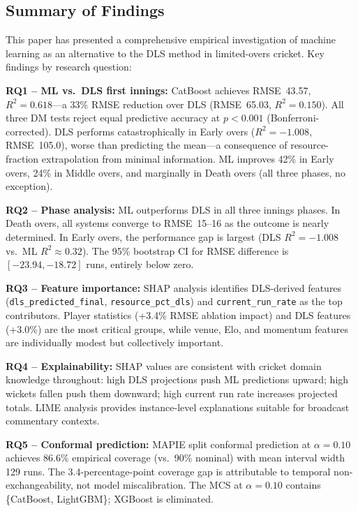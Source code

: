 \documentclass[10pt,a4paper,twocolumn]{article}
\begin{document}
\subsection{Summary of Findings}

This paper has presented a comprehensive empirical investigation of machine learning as an alternative to the DLS method in limited-overs cricket. Key findings by research question:

\textbf{RQ1 -- ML vs.\ DLS first innings:} CatBoost achieves RMSE~43.57, $R^2=0.618$---a 33\% RMSE reduction over DLS (RMSE~65.03, $R^2=0.150$). All three DM tests reject equal predictive accuracy at $p < 0.001$ (Bonferroni-corrected). DLS performs catastrophically in Early overs ($R^2 = -1.008$, RMSE~105.0), worse than predicting the mean---a consequence of resource-fraction extrapolation from minimal information. ML improves 42\% in Early overs, 24\% in Middle overs, and marginally in Death overs (all three phases, no exception).

\textbf{RQ2 -- Phase analysis:} ML outperforms DLS in all three innings phases. In Death overs, all systems converge to RMSE~15--16 as the outcome is nearly determined. In Early overs, the performance gap is largest (DLS $R^2 = -1.008$ vs.\ ML $R^2 \approx 0.32$). The 95\% bootstrap CI for RMSE difference is $[-23.94, -18.72]$ runs, entirely below zero.

\textbf{RQ3 -- Feature importance:} SHAP analysis identifies DLS-derived features (\texttt{dls\_predicted\_final}, \texttt{resource\_pct\_dls}) and \texttt{current\_run\_rate} as the top contributors. Player statistics (+3.4\% RMSE ablation impact) and DLS features (+3.0\%) are the most critical groups, while venue, Elo, and momentum features are individually modest but collectively important.

\textbf{RQ4 -- Explainability:} SHAP values are consistent with cricket domain knowledge throughout: high DLS projections push ML predictions upward; high wickets fallen push them downward; high current run rate increases projected totals. LIME analysis provides instance-level explanations suitable for broadcast commentary contexts.

\textbf{RQ5 -- Conformal prediction:} MAPIE split conformal prediction at $\alpha=0.10$ achieves 86.6\% empirical coverage (vs.\ 90\% nominal) with mean interval width 129 runs. The 3.4-percentage-point coverage gap is attributable to temporal non-exchangeability, not model miscalibration. The MCS at $\alpha=0.10$ contains \{CatBoost, LightGBM\}; XGBoost is eliminated.
\end{document}
